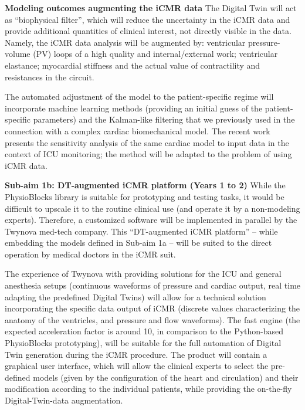 \textbf{Modeling outcomes augmenting the iCMR data}
The Digital Twin will act as ``biophysical filter'', which will reduce the uncertainty in the iCMR data\cite{gusseva23,gusseva25} and provide additional quantities of clinical interest, not directly visible in the data. Namely, the iCMR data analysis will be augmented by:  ventricular pressure-volume (PV) loops of a high quality\cite{gusseva25} and internal/external work;  ventricular elastance\cite{legall19}; myocardial stiffness and the actual value of contractility and resistances in the circuit\cite{ruijsink20,legall20}.

The automated adjustment of the model to the patient-specific regime will incorporate machine learning methods\cite{skardova2026_Heliyon} (providing an initial guess of the patient-specific parameters) and the Kalman-like filtering\cite{chabiniok12} that we previously used in the connection with a complex cardiac biomechanical model. The recent work\cite{kimmig_FIMH2025} presents the sensitivity analysis of the same cardiac model to input data in the context of ICU monitoring; the method will be adapted to the problem of using iCMR data. 

\textbf{Sub-aim 1b: DT-augmented iCMR platform (Years 1 to 2)}
While the PhysioBlocks library is suitable for prototyping and testing tasks, it would be difficult to upscale it to the routine clinical use (and operate it by a non-modeling experts). Therefore, a customized software will be implemented in parallel by the Twynova med-tech company. 
This ``DT-augmented iCMR platform'' -- while embedding the models defined in Sub-aim 1a --   will be  suited to the direct operation by medical doctors in the iCMR suit.

The experience of Twynova with providing solutions for the ICU and general anesthesia setups (continuous waveforms of pressure and cardiac output, real time adapting the predefined Digital Twins\cite{kimmig_FIMH2025}) will allow for a technical solution incorporating the specific data output of iCMR (discrete values characterizing the anatomy of the ventricles, and pressure and flow waveforms). The fast engine (the expected acceleration factor is around 10, in comparison to the Python-based PhysioBlocks prototyping), will be suitable for the full automation of Digital Twin generation during the iCMR procedure.
The product will contain a graphical user interface, which will allow the clinical experts to select the pre-defined models (given by the configuration of the heart and circulation) and their modification according to the individual patients, while providing the on-the-fly Digital-Twin-data augmentation.


